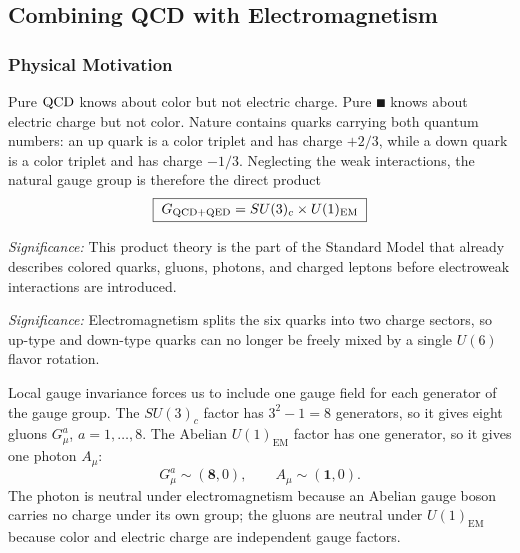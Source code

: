 \subsection{Combining QCD with Electromagnetism}\label{subsec:lec15:qcd-qed}

\subsubsection*{Physical Motivation}

Pure $\mathrm{QCD}$ knows about color but not electric charge. Pure $\QED$ knows about electric charge but not color. Nature contains quarks carrying both quantum numbers: an up quark is a color triplet and has charge $+2/3$, while a down quark is a color triplet and has charge $-1/3$. Neglecting the weak interactions, the natural gauge group is therefore the direct product
\begin{equation}
  \boxed{\;G_{\mathrm{QCD}+\mathrm{QED}}=SU(3)_c\times U(1)_{\mathrm{EM}}\;}
  \label{eq:lec15:qcd_qed_gauge_group}
\end{equation}

\textit{Significance:} This product theory is the part of the Standard Model that already describes colored quarks, gluons, photons, and charged leptons before electroweak interactions are introduced.


\textit{Significance:} Electromagnetism splits the six quarks into two charge sectors, so up-type and down-type quarks can no longer be freely mixed by a single $U(6)$ flavor rotation.

Local gauge invariance forces us to include one gauge field for each generator of the gauge group. The $SU(3)_c$ factor has $3^2-1=8$ generators, so it gives eight gluons $G_\mu^a$, $a=1,\ldots,8$. The Abelian $U(1)_{\mathrm{EM}}$ factor has one generator, so it gives one photon $A_\mu$:
\begin{equation}
  G_\mu^a\sim(\mathbf8,0),\qquad A_\mu\sim(\mathbf1,0).
  \label{eq:lec15:gauge_bosons_representations}
\end{equation}
The photon is neutral under electromagnetism because an Abelian gauge boson carries no charge under its own group; the gluons are neutral under $U(1)_{\mathrm{EM}}$ because color and electric charge are independent gauge factors.

